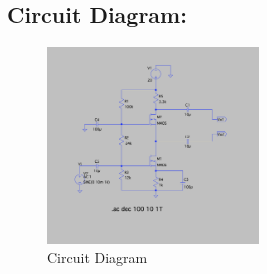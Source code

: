 \documentclass[a4paper,12pt]{report}
\begin{document}
  \vspace{0.3cm}

  \subsection{Circuit Diagram:} 
  \vspace*{1em}
  \begin{figure}[htbp]
  \centering
    \includegraphics[width=0.5\textwidth]{../Img/E2Ckt.png}
  \caption{Circuit Diagram}
  \label{fig:image}
  \end{figure}

  \vspace*{\fill} %
  \newpage
\end{document}
